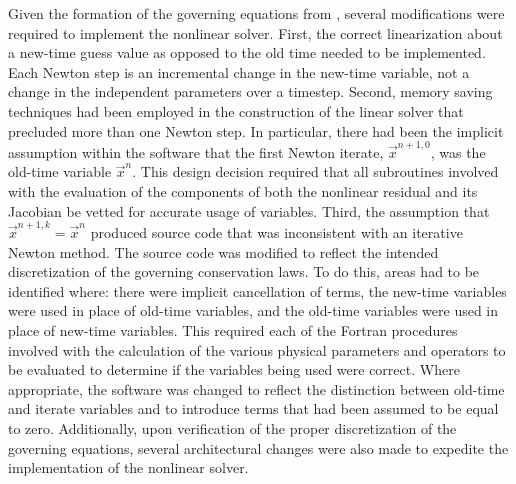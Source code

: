 Given the formation of the governing equations from , several modifications were required to implement the nonlinear solver.
First, the correct linearization about a new-time guess value as opposed to the old time needed to be implemented.
Each Newton step is an incremental change in the new-time variable, not a change in the independent parameters over a timestep.
Second, memory saving techniques had been employed in the construction of the linear solver that precluded more than one Newton step.
In particular, there had been the implicit assumption within the software that the first Newton iterate, $\vec{x}^{n+1, 0}$, was the old-time variable $\vec{x}^{n}$.
This design decision required that all subroutines involved with the evaluation of the components of both the nonlinear residual and its Jacobian be vetted for accurate usage of variables.
Third, the assumption that $\vec{x}^{n+1, k} = \vec{x}^{n}$ produced source code that was inconsistent with an iterative Newton method.
The source code was modified to reflect the intended discretization of the governing conservation laws.
To do this, areas had to be identified where: there were implicit cancellation of terms, the new-time variables were used in place of old-time variables, and the old-time variables were used in place of new-time variables.
This required each of the Fortran procedures involved with the calculation of the various physical parameters and operators to be evaluated to determine if the variables being used were correct.
Where appropriate, the software was changed to reflect the distinction between old-time and iterate variables and to introduce terms that had been assumed to be equal to zero.
Additionally, upon verification of the proper discretization of the governing equations, several architectural changes were also made to expedite the implementation of the nonlinear solver.

